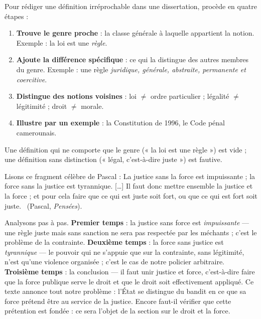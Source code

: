 \documentclass[11pt]{article}
\begin{document}
\begin{methode}
Pour rédiger une définition irréprochable dans une dissertation, procède en quatre étapes :
\begin{enumerate}
  \item \textbf{Trouve le genre proche} : la classe générale à laquelle appartient la notion. Exemple : la loi est une \emph{règle}.
  \item \textbf{Ajoute la différence spécifique} : ce qui la distingue des autres membres du genre. Exemple : une règle \emph{juridique, générale, abstraite, permanente et coercitive}.
  \item \textbf{Distingue des notions voisines} : loi $\neq$ ordre particulier ; légalité $\neq$ légitimité ; droit $\neq$ morale.
  \item \textbf{Illustre par un exemple} : la Constitution de 1996, le Code pénal camerounais.
\end{enumerate}
Une définition qui ne comporte que le genre (« la loi est une règle ») est vide ; une définition sans distinction (« légal, c'est-à-dire juste ») est fautive.
\end{methode}

\begin{experience}
Lisons ce fragment célèbre de Pascal : \guillemotleft La justice sans la force est impuissante ; la force sans la justice est tyrannique. [\dots] Il faut donc mettre ensemble la justice et la force ; et pour cela faire que ce qui est juste soit fort, ou que ce qui est fort soit juste. \guillemotright\ (Pascal, \emph{Pensées}).

Analysons pas à pas. \textbf{Premier temps} : la justice sans force est \emph{impuissante} — une règle juste mais sans sanction ne sera pas respectée par les méchants ; c'est le problème de la contrainte. \textbf{Deuxième temps} : la force sans justice est \emph{tyrannique} — le pouvoir qui ne s'appuie que sur la contrainte, sans légitimité, n'est qu'une violence organisée ; c'est le cas de notre policier arbitraire. \textbf{Troisième temps} : la conclusion — il faut unir justice et force, c'est-à-dire faire que la force publique serve le droit et que le droit soit effectivement appliqué. Ce texte annonce tout notre problème : l'État se distingue du bandit en ce que sa force prétend être au service de la justice. Encore faut-il vérifier que cette prétention est fondée : ce sera l'objet de la section sur le droit et la force.
\end{experience}
\end{document}

